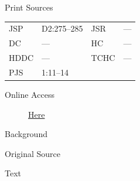 			\begin{description}
				\item[Print Sources]
			\end{description}

				\begin{tabular}{p{0.5in}p{1in}p{0.5in}p{1in}}
				JSP	 	& D2:275--285	& JSR 		& --- \\
				DC	 	& ---	 	& HC 		& --- \\
				HDDC 	& ---		& TCHC 		& --- \\
				PJS 	& 1:11--14			& 	 		&  \\
				\end{tabular}
			
			\begin{description}
				\item[Online Access] \href{https://www.josephsmithpapers.org/paper-summary/history-circa-summer-1832/1}{Here}
			\end{description}
			
			\begin{description}
				\item[Background]
			\end{description}
			
			
			\begin{description}
				\item[Original Source]
			\end{description}
			
			
			\begin{description}
				\item[Text]
			\end{description}
			
